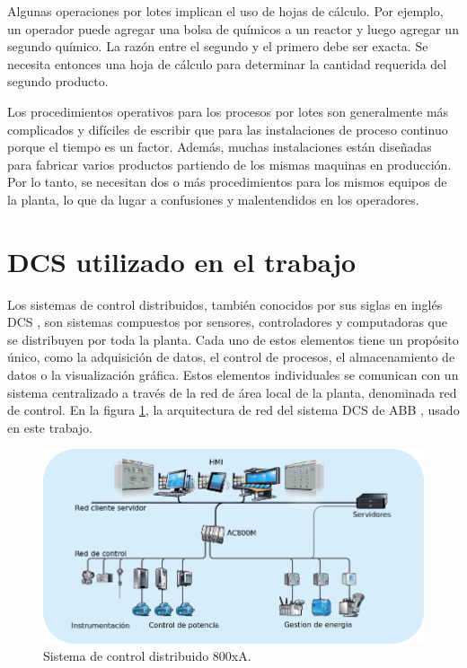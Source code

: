 Algunas operaciones por lotes implican el uso de hojas de cálculo. Por ejemplo, un operador puede agregar una bolsa de químicos a un reactor y luego agregar un segundo químico. La razón entre el segundo y el primero debe ser exacta. Se necesita entonces una hoja de cálculo para determinar la cantidad requerida del segundo producto. 

Los procedimientos operativos para los procesos por lotes son generalmente más complicados y difíciles de escribir que para las instalaciones de proceso continuo porque el tiempo es un factor. Además, muchas instalaciones están diseñadas para fabricar varios productos partiendo de los mismas maquinas en producción. Por lo tanto, se necesitan dos o más procedimientos para los mismos equipos de la planta, lo que da lugar a confusiones y malentendidos en los operadores.

\section{DCS utilizado en el trabajo}

Los sistemas de control distribuidos, también conocidos por sus siglas en inglés DCS \citep{DCS}, son sistemas compuestos por sensores, controladores y computadoras que se distribuyen por toda la planta. Cada uno de estos elementos tiene un propósito único, como la adquisición de datos, el control de procesos, el almacenamiento de datos o la visualización gráfica. Estos elementos individuales se comunican con un sistema centralizado a través de la red de área local de la planta, denominada red de control. En la figura \ref{fig:800xA}, la arquitectura de red del sistema DCS de ABB \citep{DCSaq}, usado en este trabajo.

\begin{figure}[htpb]
	\centering
	\includegraphics[scale=.45]{./Figures/800xA.png}
	\caption{Sistema de control distribuido 800xA\protect\footnotemark.}
	\label{fig:800xA}
\end{figure}


